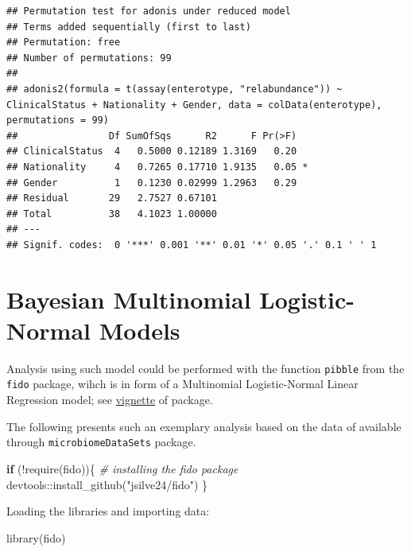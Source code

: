 \documentclass[
]{book}
\newenvironment{Shaded}{\begin{snugshade}}{\end{snugshade}}
\newcommand{\CommentTok}[1]{\textcolor[rgb]{0.56,0.35,0.01}{\textit{#1}}}
\newcommand{\ControlFlowTok}[1]{\textcolor[rgb]{0.13,0.29,0.53}{\textbf{#1}}}
\newcommand{\FunctionTok}[1]{\textcolor[rgb]{0.00,0.00,0.00}{#1}}
\newcommand{\NormalTok}[1]{#1}
\newcommand{\SpecialCharTok}[1]{\textcolor[rgb]{0.00,0.00,0.00}{#1}}
\newcommand{\StringTok}[1]{\textcolor[rgb]{0.31,0.60,0.02}{#1}}
\begin{document}
\begin{verbatim}
## Permutation test for adonis under reduced model
## Terms added sequentially (first to last)
## Permutation: free
## Number of permutations: 99
## 
## adonis2(formula = t(assay(enterotype, "relabundance")) ~ ClinicalStatus + Nationality + Gender, data = colData(enterotype), permutations = 99)
##                Df SumOfSqs      R2      F Pr(>F)  
## ClinicalStatus  4   0.5000 0.12189 1.3169   0.20  
## Nationality     4   0.7265 0.17710 1.9135   0.05 *
## Gender          1   0.1230 0.02999 1.2963   0.29  
## Residual       29   2.7527 0.67101                
## Total          38   4.1023 1.00000                
## ---
## Signif. codes:  0 '***' 0.001 '**' 0.01 '*' 0.05 '.' 0.1 ' ' 1
\end{verbatim}

\hypertarget{bayesian-multinomial-logistic-normal-models}{%
\section{Bayesian Multinomial Logistic-Normal Models}\label{bayesian-multinomial-logistic-normal-models}}

Analysis using such model could be performed with the function \texttt{pibble} from the \texttt{fido}
package, wihch is in form of a Multinomial Logistic-Normal Linear Regression model; see
\href{https://jsilve24.github.io/fido/articles/introduction-to-fido.html}{vignette} of package.

The following presents such an exemplary analysis based on the
data of \citet{Sprockett2020} available
through \texttt{microbiomeDataSets} package.

\begin{Shaded}
\begin{Highlighting}[]
\ControlFlowTok{if}\NormalTok{ (}\SpecialCharTok{!}\FunctionTok{require}\NormalTok{(fido))\{}
  \CommentTok{\# installing the fido package}
\NormalTok{  devtools}\SpecialCharTok{::}\FunctionTok{install\_github}\NormalTok{(}\StringTok{"jsilve24/fido"}\NormalTok{)}
\NormalTok{\}}
\end{Highlighting}
\end{Shaded}

Loading the libraries and importing data:

\begin{Shaded}
\begin{Highlighting}[]
\FunctionTok{library}\NormalTok{(fido)}
\end{Highlighting}
\end{Shaded}
\end{document}
